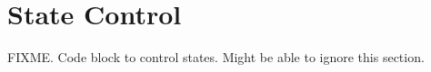 \section{State Control}

FIXME. 
Code block to control states.
Might be able to ignore this section.